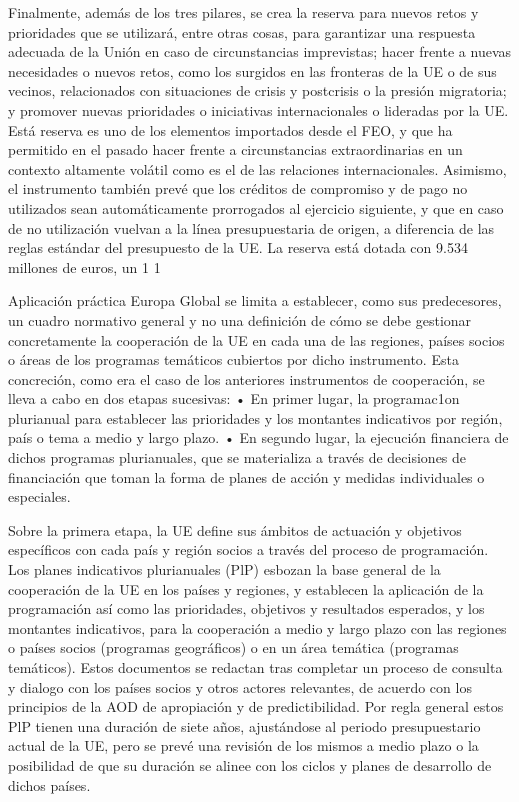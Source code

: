 \documentclass[10pt,a4paper]{article}
\begin{document}
{Finalmente, además de los tres pilares, se crea la reserva para nuevos retos y prioridades que se utilizará, entre otras cosas, para garantizar una respuesta adecuada de la Unión en caso de circunstancias imprevistas; hacer frente a nuevas necesidades o nuevos retos, como los surgidos en las fronteras de la UE o de sus vecinos, relacionados con situaciones de crisis y postcrisis o la presión migratoria; y promover nuevas prioridades o iniciativas internacionales o lideradas por la UE. Está reserva es uno de los elementos importados desde el FEO, y que ha permitido en el pasado hacer frente a circunstancias extraordinarias en un contexto altamente volátil como es el de las relaciones internacionales. Asimismo, el instrumento también prevé que los créditos de compromiso y de pago no utilizados sean automáticamente prorrogados al ejercicio siguiente, y que en caso de no utilización vuelvan a la línea presupuestaria de origen, a diferencia de las reglas estándar del presupuesto de la UE. La reserva está dotada con 9.534 millones de euros, un 1 1%


Aplicación práctica  
Europa Global se limita a establecer, como sus predecesores, un cuadro normativo general y no una definición de cómo se debe gestionar concretamente la cooperación de la UE en cada una de las regiones, países socios o áreas de los programas temáticos cubiertos por dicho instrumento. Esta concreción, como era el caso de los anteriores instrumentos de cooperación, se lleva a cabo en dos etapas sucesivas:
• En primer lugar, la programac1on plurianual para establecer las prioridades y los montantes indicativos por región, país o tema a medio y largo plazo.
• En segundo lugar, la ejecución financiera de dichos programas plurianuales, que se materializa a través de decisiones de financiación que toman la forma de planes de acción y medidas individuales o especiales.

Sobre la primera etapa, la UE define sus ámbitos de actuación y objetivos específicos con cada país y región socios a través del proceso de programación. Los planes indicativos plurianuales (PlP) esbozan la base general de la cooperación de la UE en los países y regiones, y establecen la aplicación de la programación así como las prioridades, objetivos y resultados esperados, y los montantes indicativos, para la cooperación a medio y largo plazo con las regiones o países socios (programas geográficos) o en un área temática (programas temáticos). Estos documentos se redactan tras completar un proceso de consulta y dialogo con los países socios y otros actores relevantes, de acuerdo con los principios de la AOD de apropiación y de predictibilidad. Por regla general estos PlP tienen una duración de siete años, ajustándose al periodo presupuestario actual de la UE, pero se prevé una revisión de los mismos a medio plazo o la posibilidad de que su duración se alinee con los ciclos y planes de desarrollo de dichos países.

}
\end{document}
